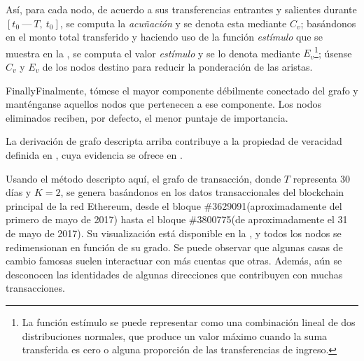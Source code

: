 Así, para cada nodo, de acuerdo a sus transferencias entrantes y salientes durante $[t_0\ —\ T,\ t_0]$, se computa la \textit{acuñación} y se denota esta mediante $C_v$; basándonos en el monto total transferido y haciendo uso de la función \textit{estímulo} que se muestra en la , se computa el valor \textit{estímulo} y se lo denota mediante $E_v$\footnote{La función estímulo se puede representar como una combinación lineal de dos distribuciones normales, que produce un valor máximo cuando la suma transferida es cero o alguna proporción de las transferencias de ingreso.}; úsense $C_v$ y $E_v$ de los nodos destino para reducir la ponderación de las aristas.

FinallyFinalmente, tómese el mayor componente débilmente conectado del grafo y manténganse aquellos nodos que pertenecen a ese componente. Los nodos eliminados reciben, por defecto, el menor puntaje de importancia.

La derivación de grafo descripta arriba contribuye a la propiedad de veracidad definida en , cuya evidencia se ofrece en .

Usando el método descripto aquí, el grafo de transacción, donde $T$ representa 30 días y $K=2$, se genera basándonos en los datos transaccionales del blockchain principal de la red Ethereum, desde el bloque \#3629091(aproximadamente del primero de mayo de 2017) hasta el bloque \#3800775(de aproximadamente el 31 de mayo de 2017). Su visualización está disponible en la , y todos los nodos se redimensionan en función de su grado. Se puede observar que algunas casas de cambio famosas suelen interactuar con más cuentas que otras. Además, aún se desconocen las identidades de algunas direcciones que contribuyen con muchas transacciones.

